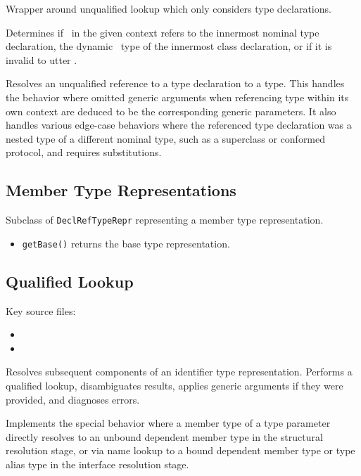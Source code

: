 \documentclass[../generics]{subfiles}
\begin{document}
Wrapper around unqualified lookup which only considers type declarations.

Determines if \tSelf\ in the given context refers to the innermost nominal type declaration, the dynamic \tSelf\ type of the innermost class declaration, or if it is invalid to utter \tSelf.

Resolves an unqualified reference to a type declaration to a type. This handles the behavior where omitted generic arguments when referencing type within its own context are deduced to be the corresponding generic parameters. It also handles various edge-case behaviors where the referenced type declaration was a nested type of a different nominal type, such as a superclass or conformed protocol, and requires substitutions.

\subsection*{Member Type Representations}

Subclass of \texttt{DeclRefTypeRepr} representing a member type representation.
\begin{itemize}
\item \texttt{getBase()} returns the base type representation.
\end{itemize}

\subsection*{Qualified Lookup}

Key source files:
\begin{itemize}
\item {}
\item {}
\end{itemize}

Resolves subsequent components of an identifier type representation. Performs a qualified lookup, disambiguates results, applies generic arguments if they were provided, and diagnoses errors.

Implements the special behavior where a member type of a type parameter directly resolves to an unbound dependent member type in the structural resolution stage, or via name lookup to a bound dependent member type or type alias type in the interface resolution stage.
\end{document}
